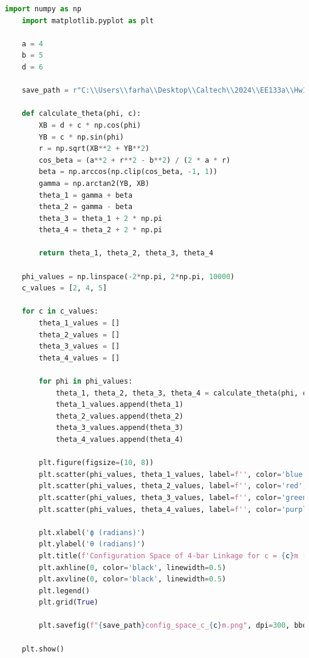 \documentclass[12pt]{article}
\begin{document}
\begin{lstlisting}[language=Python]
    import numpy as np
    import matplotlib.pyplot as plt
    
    a = 4
    b = 5
    d = 6
    
    save_path = r"C:\\Users\\farha\\Desktop\\Caltech\\2024\\EE133a\\Hw1"
    
    def calculate_theta(phi, c):
        XB = d + c * np.cos(phi)
        YB = c * np.sin(phi)
        r = np.sqrt(XB**2 + YB**2)
        cos_beta = (a**2 + r**2 - b**2) / (2 * a * r)
        beta = np.arccos(np.clip(cos_beta, -1, 1))
        gamma = np.arctan2(YB, XB)
        theta_1 = gamma + beta
        theta_2 = gamma - beta
        theta_3 = theta_1 + 2 * np.pi
        theta_4 = theta_2 + 2 * np.pi
        
        return theta_1, theta_2, theta_3, theta_4
    
    phi_values = np.linspace(-2*np.pi, 2*np.pi, 10000)
    c_values = [2, 4, 5]
    
    for c in c_values:
        theta_1_values = []
        theta_2_values = []
        theta_3_values = []
        theta_4_values = []
        
        for phi in phi_values:
            theta_1, theta_2, theta_3, theta_4 = calculate_theta(phi, c)
            theta_1_values.append(theta_1)
            theta_2_values.append(theta_2)
            theta_3_values.append(theta_3)
            theta_4_values.append(theta_4)
        
        plt.figure(figsize=(10, 8))
        plt.scatter(phi_values, theta_1_values, label=f'', color='blue', s=1, marker='o')
        plt.scatter(phi_values, theta_2_values, label=f'', color='red', s=1, marker='o')
        plt.scatter(phi_values, theta_3_values, label=f'', color='green', s=1, marker='o')
        plt.scatter(phi_values, theta_4_values, label=f'', color='purple', s=1, marker='o')
    
        plt.xlabel('ϕ (radians)')
        plt.ylabel('θ (radians)')
        plt.title(f'Configuration Space of 4-bar Linkage for c = {c}m (ϕ vs θ)')
        plt.axhline(0, color='black', linewidth=0.5)
        plt.axvline(0, color='black', linewidth=0.5)
        plt.legend()
        plt.grid(True)
    
        plt.savefig(f"{save_path}config_space_c_{c}m.png", dpi=300, bbox_inches='tight')
    
    plt.show()
    \end{lstlisting}
\end{document}
